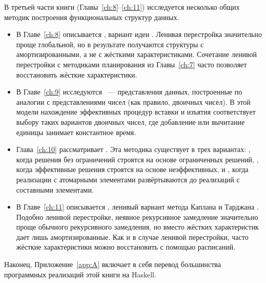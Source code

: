 В третьей части книги (Главы~\ref{ch:8}--\ref{ch:11}) исследуется
несколько общих методик построения функциональных структур данных.
\begin{itemize}
\item В Главе~\ref{ch:8} описывается , вариант идеи  \cite{Overmars1983}.  Ленивая перестройка значительно
  проще глобальной, но в результате получаются структуры с
  амортизированными, а не с жёсткими характеристиками.  Сочетание
  ленивой перестройки с методиками планирования из Главы~\ref{ch:7}
  часто позволяет восстановить жёсткие характеристики.
\item В Главе~\ref{ch:9} исследуются ~--- представления
  данных, построенные по аналогии с представлениями чисел (как
  правило, двоичных чисел). В этой модели нахождение эффективных
  процедур вставки и изъятия соответствует выбору таких вариантов
  двоичных чисел, где добавление или вычитание единицы занимает
  константное время.
\item Глава~\ref{ch:10} рассматривает  \cite{Buchsbaum1993}. Эта
  методика существует в трех вариантах: , когда решения без
  ограничений строятся на основе ограниченных решений,
  , когда
  эффективные решения строятся на основе неэффективных, и
  , когда реализации с атомарными элементами развёртываются до
  реализаций с составными элементами.
\item В Главе~\ref{ch:11} описывается , ленивый вариант метода
   Каплана и
  Тарджана \cite{KaplanTarjan1995}.  Подобно ленивой перестройке,
  неявное рекурсивное замедление значительно проще обычного
  рекурсивного замедления, но вместо жёстких характеристик дает лишь
  амортизированные. Как и в случае ленивой перестройки, часто жёсткие
  характеристики можно восстановить с помощью расписаний.
\end{itemize}

Наконец, Приложение~\ref{app:A} включает в себя перевод большинства
программных реализаций этой книги на Haskell.

